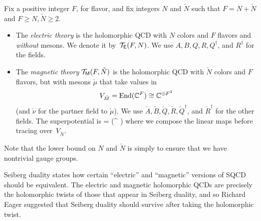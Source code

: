 \documentclass[11pt]{amsart}
\def\SU{{\rm SU}}
\begin{document}
\begin{dfn}
Fix a positive integer $F$, for flavor, and fix integers $N$ and $\check{N}$ such that $F = N + \check{N}$ and $F \geq N, \check{N} \geq 2$.
\begin{itemize}
\item
The {\em electric theory} is the holomorphic QCD with $N$ colors and $F$ flavors and {\em without} mesons.
We denote it by~$\mathcal T_{\mathsf E}(F, N)$.
We use $A, B, Q, R, Q^\dag$, and $R^\dag$ for the fields.
\item
The {\em magnetic theory} $\mathcal T_{{\sf M}}(F, \check{N})$ is the holomorphic QCD with $\check{N}$ colors and $F$ flavors, but with mesons $\check{\mu}$ that take values in $$V_{\check{M}} = {\rm End}(\mathbb C^F) \cong \mathbb C^{\oplus F^2}$$
(and $\check{\nu}$ for the partner field to $\check{\mu}$).
We use $\check{A}, \check{B}, \check{Q}, \check{R}, \check{Q}^\dag$, and $\check{R}^\dag$ for the other fields.
The superpotential is 
\beqn\label{eqn:checkW}
 =  \Tr(^\dag \check{\mu}  )
\eeqn
where we compose the linear maps before tracing over~$V_{\check{N}}$.
\end{itemize}
\end{dfn}


Note that the lower bound on $N$ and $\check{N}$ is simply to ensure that we have nontrivial gauge groups.


Seiberg duality states how certain ``electric'' and ``magnetic'' versions of SQCD should be equivalent.
The electric and magnetic holomorphic QCDs are precisely the holomorphic twists of those that appear in Seiberg duality,
and so Richard Eager suggested that Seiberg duality should survive after taking the holomorphic twist.
\end{document}

